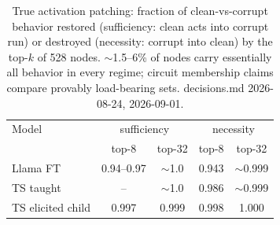 \begin{table}[t]
\centering
\begin{tabular}{lcccc}
\hline
Model & \multicolumn{2}{c}{sufficiency} & \multicolumn{2}{c}{necessity} \\
 & top-8 & top-32 & top-8 & top-32 \\
\hline
Llama FT & 0.94--0.97 & $\sim$1.0 & 0.943 & $\sim$0.999 \\
TS taught & -- & $\sim$1.0 & 0.986 & $\sim$0.999 \\
TS elicited child & 0.997 & 0.999 & 0.998 & 1.000 \\
\hline
\end{tabular}
\caption{True activation patching: fraction of clean-vs-corrupt behavior restored (sufficiency: clean acts into corrupt run) or destroyed (necessity: corrupt into clean) by the top-$k$ of 528 nodes. $\sim$1.5--6\% of nodes carry essentially all behavior in every regime; circuit membership claims compare provably load-bearing sets. decisions.md 2026-08-24, 2026-09-01.}
\label{tab:faithfulness}
\end{table}
